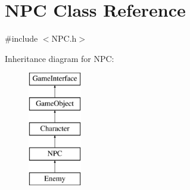 \hypertarget{class_n_p_c}{\section{N\-P\-C Class Reference}
\label{class_n_p_c}
}


{\ttfamily \#include $<$N\-P\-C.\-h$>$}

Inheritance diagram for N\-P\-C\-:\begin{figure}[H]
\begin{center}
\leavevmode
\includegraphics[height=5.000000cm]{class_n_p_c}
\end{center}
\end{figure}
